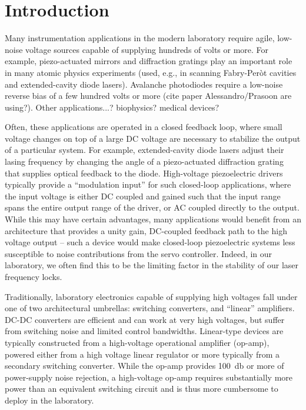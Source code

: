 \documentclass[aip,rsi,reprint]{revtex4-1} %
\begin{document}
\section{Introduction}
\label{Sec:Introduction}

Many instrumentation applications in the modern laboratory require agile, low-noise voltage sources capable of supplying hundreds of volts or more.
For example, piezo-actuated mirrors and diffraction gratings play an important role in many atomic physics experiments (used, e.g., in scanning Fabry-Per{\`o}t cavities and extended-cavity diode lasers).
Avalanche photodiodes require a low-noise reverse bias of a few hundred volts or more (cite paper Alessandro/Prasoon are using?).
Other applications...? biophysics? medical devices?

Often, these applications are operated in a closed feedback loop, where small voltage changes on top of a large DC voltage are necessary to stabilize the output of a particular system.
For example, extended-cavity diode lasers adjust their lasing frequency by changing the angle of a piezo-actuated diffraction grating that supplies optical feedback to the diode.
High-voltage piezoelectric drivers typically provide a ``modulation input'' for  such closed-loop applications, where the input voltage is either DC coupled and gained such that the input range spans the entire output range of the driver, or AC coupled directly to the output.
While this may have certain advantages, many applications would benefit from an architecture that provides a unity gain, DC-coupled feedback path to the high voltage output -- such a device would make closed-loop piezoelectric systems less susceptible to noise contributions from the servo controller.
Indeed, in our laboratory, we often find this to be the limiting factor in the stability of our laser frequency locks.

Traditionally, laboratory electronics capable of supplying high voltages fall under one of two architectural umbrellas: switching converters, and ``linear'' amplifiers.
DC-DC converters are efficient and can work at very high voltages, but suffer from switching noise and limited control bandwidths.
Linear-type devices are typically constructed from a high-voltage operational amplifier (op-amp), powered either from a high voltage linear regulator or more typically from a secondary switching converter.
While the op-amp provides \SI{100}{\decibel} or more of power-supply noise rejection, a high-voltage op-amp requires substantially more power than an equivalent switching circuit and is thus more cumbersome to deploy in the laboratory.
\end{document}
